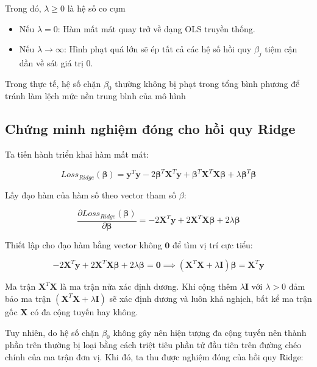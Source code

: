 Trong đó, $\lambda \ge 0$ là hệ số co cụm

\begin{itemize}[topsep=0pt, itemsep=2.5pt, leftmargin=1.5cm]
    \item Nếu $\lambda = 0$: Hàm mất mát quay trở về dạng OLS truyền thống.
    \item Nếu $\lambda \to \infty$: Hình phạt quá lớn sẽ ép tất cả các hệ số hồi quy $\beta_j$ tiệm cận dần về sát giá trị 0.
\end{itemize}

Trong thực tế, hệ số chặn $\beta_0$ thường không bị phạt trong tổng bình phương để tránh làm lệch mức nền trung bình của mô hình

\subsection{Chứng minh nghiệm đóng cho hồi quy Ridge}

Ta tiến hành triển khai hàm mất mát:

$$Loss_{Ridge}(\boldsymbol{\beta}) = \mathbf{y}^T\mathbf{y} - 2\boldsymbol{\beta}^T\mathbf{X}^T\mathbf{y} + \boldsymbol{\beta}^T\mathbf{X}^T\mathbf{X}\boldsymbol{\beta} + \lambda \boldsymbol{\beta}^T\boldsymbol{\beta}$$

Lấy đạo hàm của hàm số theo vector tham số $\beta$:

$$\frac{\partial Loss_{Ridge}(\boldsymbol{\beta})}{\partial \boldsymbol{\beta}} = -2\mathbf{X}^T\mathbf{y} + 2\mathbf{X}^T\mathbf{X}\boldsymbol{\beta} + 2\lambda\boldsymbol{\beta}$$

Thiết lập cho đạo hàm bằng vector không $\mathbf{0}$ để tìm vị trí cực tiểu:

$$-2\mathbf{X}^T\mathbf{y} + 2\mathbf{X}^T\mathbf{X}\boldsymbol{\beta} + 2\lambda\boldsymbol{\beta} = \mathbf{0} \implies (\mathbf{X}^T\mathbf{X} + \lambda \mathbf{I})\boldsymbol{\beta} = \mathbf{X}^T\mathbf{y}$$

Ma trận $\mathbf{X}^T\mathbf{X}$ là ma trận nửa xác định dương. Khi cộng thêm $\lambda \mathbf{I}$ với $\lambda > 0$ đảm bảo ma trận $(\mathbf{X}^T\mathbf{X} + \lambda \mathbf{I})$ sẽ xác định dương và luôn khả nghịch, bất kể ma trận gốc $\mathbf{X}$ có đa cộng tuyến hay không.

Tuy nhiên, do hệ số chặn $\beta_0$ không gây nên hiện tượng đa cộng tuyến nên thành phần trên thường bị loại bằng cách triệt tiêu phần tử đầu tiên trên đường chéo chính của ma trận đơn vị. Khi đó, ta thu được nghiệm đóng của hồi quy Ridge:

